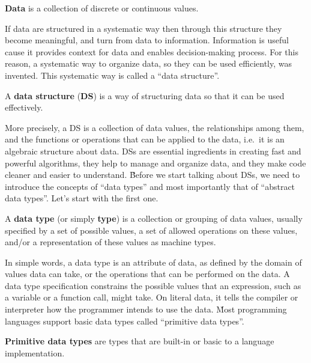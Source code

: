 \bd[Data]
\textbf{Data} is a collection of discrete or continuous values.
\ed

If data are structured in a systematic way then through this structure they become meaningful, and turn from data to
information. Information is useful cause it provides context for data and enables decision-making process. For this
reason, a systematic way to organize data, so they can be used efficiently, was invented. This systematic way is
called a ``data structure''.

A \textbf{data structure} (\textbf{DS}) is a way of structuring data so that it can be used effectively.
\ed

More precisely, a DS is a collection of data values, the relationships among them, and the functions or operations that
can be applied to the data, i.e.\ it is an algebraic structure about data. DSs are essential ingredients in creating 
fast and powerful algorithms, they help to manage and organize data, and they make code cleaner and easier to understand.
\v

Before we start talking about DSs, we need to introduce the concepts of ``data types'' and most importantly that of
``abstract data types''. Let's start with the first one.

A \textbf{data type} (or simply \textbf{type}) is a collection or grouping of data values, usually specified by a set
of possible values, a set of allowed operations on these values, and/or a representation of these values as machine
types.
\ed

In simple words, a data type is an attribute of data, as defined by the domain of values data can take, or the
operations that can be performed on the data. A data type specification constrains the possible values that an
expression, such as a variable or a function call, might take. On literal data, it tells the compiler or interpreter
how the programmer intends to use the data. \v

Most programming languages support basic data types called ``primitive data types''.

\textbf{Primitive data types} are types that are built-in or basic to a language implementation.
\ed

